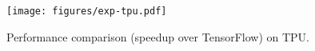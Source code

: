 


\begin{figure}
  \centering
\texttt{[image: figures/exp-tpu.pdf]}
\vspace{-10pt}
\caption{\footnotesize Performance comparison (speedup over TensorFlow) on TPU.}
\label{fig:exp-tpu}
\vspace{-12pt}
\end{figure}

